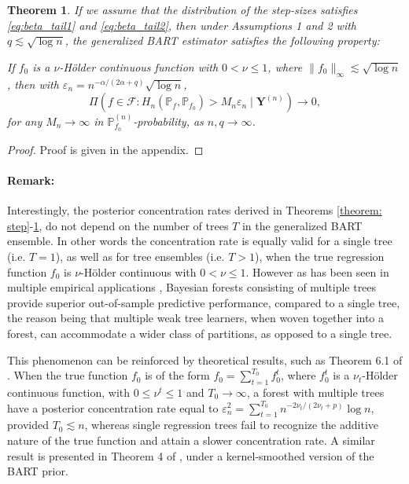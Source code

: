 \documentclass[12pt]{article}
\newcommand{\bm}[1]{\boldsymbol{#1}}
\renewcommand{\P}{\mathbb{P}}
\newcommand{\Y}{\bm{Y}}
\newcommand{\1}{\mathbb{I}}
\def\Y{\bm{Y}}
\renewcommand{\P}{\mathbb{P}}
\renewcommand{\Y}{\bm{Y}}
\theoremstyle{plain}
\newtheorem{theorem}{Theorem}[section]
\theoremstyle{definition}
\theoremstyle{remark}
\begin{document}
\begin{theorem}\label{theorem: smooth}
If we assume that the distribution of the step-sizes satisfies \eqref{eq:beta_tail1} and \eqref{eq:beta_tail2}, then under Assumptions 1 and 2 with $q \lesssim \sqrt{\log n}$, the generalized BART estimator satisfies the following property: 
 
If $f_0$ is a $\nu$-H\"{o}lder continuous function with  {$0<\nu\leq 1$}, where $\|f_0\|_\infty\lesssim \sqrt{\log n}$, then with $\varepsilon_n=n^{-\alpha/(2\alpha+q)}\sqrt{\log n}$,
\begin{equation*}
\Pi\left( f \in \mathcal{F}: H_n(\P_f,\P_{f_0}) > M_n \varepsilon_n \mid \Y^{(n)}\right) \to 0,
\end{equation*}
for any $M_n \rightarrow \infty$ in $\P_{f_0}^{(n)}$-probability, as $n,q \to \infty$. 
\end{theorem}
\vspace{-10pt}
\begin{proof}
Proof is given in the appendix.
\end{proof}

\paragraph{Remark:}
Interestingly, the posterior concentration rates derived in Theorems \ref{theorem: step}-\ref{theorem: smooth}, do not depend on the number of trees $T$ in the generalized BART ensemble. In other words the concentration rate is equally valid for a single tree (i.e. $T=1$), as well as for tree ensembles (i.e. $T > 1$), when the true regression function $f_0$ is $\nu$-H\"older continuous with $0 < \nu \le 1$. However as has been seen in multiple empirical applications \citep{chipman2010bart}, Bayesian forests consisting of multiple trees provide superior out-of-sample predictive performance, compared to a single tree, the reason being that multiple weak tree learners, when woven together into a forest, can accommodate a wider class of partitions, as opposed to a single tree. 

This phenomenon can be reinforced by theoretical results, such as Theorem 6.1 of \cite{rockova2020posterior}. When the true function $f_0$ is of the form $f_0 = \sum_{t=1}^{T_0} f_0^t$, where $f_0^t$ is a $\nu_t$-H\"older continuous function, with $0 \le \nu^t \le 1$ and $T_0 \to \infty$, a forest with multiple trees have a posterior concentration rate equal to $\varepsilon_n^2 = \sum_{t=1}^{T_0} n^{-2\nu_t/(2\nu_t+p)}\log n$, provided $T_0 \lesssim n$, whereas single regression trees fail to recognize the additive nature of the true function and attain a slower concentration rate. A similar result is presented in Theorem 4 of \cite{linero2017bayesian}, under a kernel-smoothed version of the BART prior. 
\end{document}
